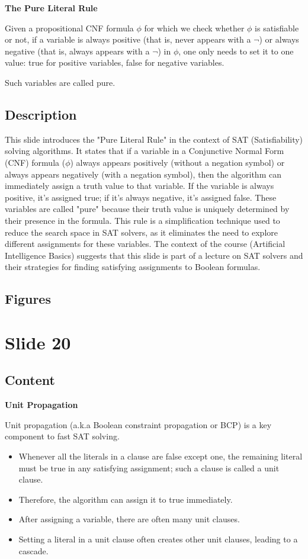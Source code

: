 \documentclass{article}%
\begin{document}
\textbf{The Pure Literal Rule}

Given a propositional CNF formula $\phi$ for which we check whether $\phi$ is satisfiable or not, if a variable is always positive (that is, never appears with a $\neg$) or always negative (that is, always appears with a $\neg$) in $\phi$, one only needs to set it to one value: true for positive variables, false for negative variables.

Such variables are called pure.
%
\subsection{Description}%
This slide introduces the "Pure Literal Rule" in the context of SAT (Satisfiability) solving algorithms.  It states that if a variable in a Conjunctive Normal Form (CNF) formula ($\phi$) always appears positively (without a negation symbol) or always appears negatively (with a negation symbol), then the algorithm can immediately assign a truth value to that variable.  If the variable is always positive, it's assigned true; if it's always negative, it's assigned false.  These variables are called "pure" because their truth value is uniquely determined by their presence in the formula.  This rule is a simplification technique used to reduce the search space in SAT solvers, as it eliminates the need to explore different assignments for these variables. The context of the course (Artificial Intelligence Basics) suggests that this slide is part of a lecture on SAT solvers and their strategies for finding satisfying assignments to Boolean formulas.%
\subsection{Figures}%
\begin{figure}[H]%
\centering%
\end{figure}

%
\newpage%
\section{Slide 20}%
\label{sec:Slide20}%
\subsection{Content}%

\textbf{Unit Propagation}

Unit propagation (a.k.a Boolean constraint propagation or BCP) is a key component to fast SAT solving.
\begin{itemize}
    \item Whenever all the literals in a clause are false except one, the remaining literal must be true in any satisfying assignment; such a clause is called a unit clause.
    \item Therefore, the algorithm can assign it to true immediately.
    \item After assigning a variable, there are often many unit clauses.
    \item Setting a literal in a unit clause often creates other unit clauses, leading to a cascade.
\end{itemize}
\end{document}
